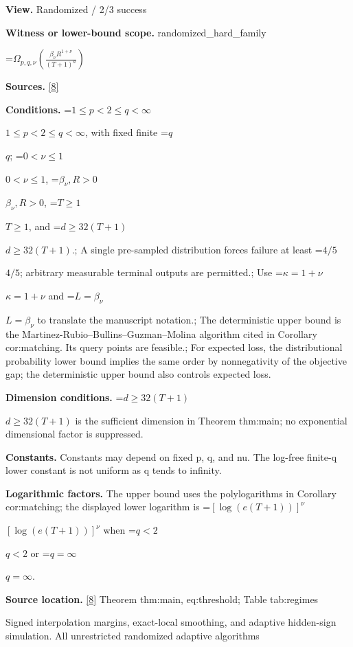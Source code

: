 \documentclass[10pt,a4paper]{article}
\newcommand{\AtlasMath}[1]{\par\begingroup\centering\setbox0=\hbox{$\displaystyle #1$}\ifdim\wd0>1.4\linewidth\typeout{ATLAS WIDE FORMULA: \the\wd0}\fi\ifdim\wd0>\linewidth\resizebox{\linewidth}{!}{\box0}\else\box0\fi\par\endgroup}
\newcommand{\AtlasInlineMath}[1]{\begingroup\setbox0=\hbox{$#1$}\ifdim\wd0>.4\linewidth\endgroup\AtlasMath{#1}\else\endgroup$#1$\fi}
\begin{document}
\textbf{View.} Randomized / 2/3 success



\textbf{Witness or lower-bound scope.} randomized\_hard\_family



\AtlasMath{\Omega_{p,q,\nu}\!\left(\frac{\beta_\nu R^{1+\nu}}{(T+1)^a}\right)}


\textbf{Sources.} \href{https://github.com/WU-Wendao/Colombo/blob/main/colombo_sensorium/Complexity_altas/data/sources/colombo/B1/manuscript.pdf}{[8]}



\textbf{Conditions.} \AtlasInlineMath{1\le p<2\le q<\infty}, with fixed finite \AtlasInlineMath{q}; \AtlasInlineMath{0<\nu\le1}, \AtlasInlineMath{\beta_\nu,R>0}, \AtlasInlineMath{T\ge1}, and \AtlasInlineMath{d\ge32(T+1)}.; A single pre-sampled distribution forces failure at least \AtlasInlineMath{4/5}; arbitrary measurable terminal outputs are permitted.; Use \AtlasInlineMath{\kappa=1+\nu} and \AtlasInlineMath{L=\beta_\nu} to translate the manuscript notation.; The deterministic upper bound is the Martinez-Rubio--Bullins--Guzman--Molina algorithm cited in Corollary cor:matching. Its query points are feasible.; For expected loss, the distributional probability lower bound implies the same order by nonnegativity of the objective gap; the deterministic upper bound also controls expected loss.



\textbf{Dimension conditions.} \AtlasInlineMath{d\ge32(T+1)} is the sufficient dimension in Theorem thm:main; no exponential dimensional factor is suppressed.



\textbf{Constants.} Constants may depend on fixed p, q, and nu. The log-free finite-q lower constant is not uniform as q tends to infinity.



\textbf{Logarithmic factors.} The upper bound uses the polylogarithms in Corollary cor:matching; the displayed lower logarithm is \AtlasInlineMath{[\log(e(T+1))]^\nu} when \AtlasInlineMath{q<2} or \AtlasInlineMath{q=\infty}.



\textbf{Source location.} \href{https://github.com/WU-Wendao/Colombo/blob/main/colombo_sensorium/Complexity_altas/data/sources/colombo/B1/manuscript.pdf}{[8]} Theorem thm:main, eq:threshold; Table tab:regimes



Signed interpolation margins, exact-local smoothing, and adaptive hidden-sign simulation. All unrestricted randomized adaptive algorithms
\end{document}

